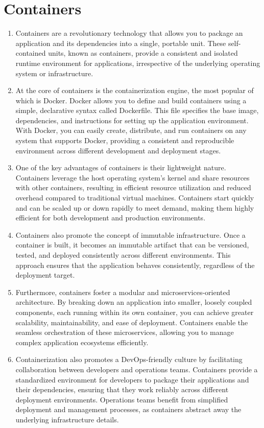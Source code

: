 \section*{Containers}

\begin{enumerate}
    \item Containers are a revolutionary technology that allows you to package an application and its dependencies into a single, portable unit. These self-contained units, known as containers, provide a consistent and isolated runtime environment for applications, irrespective of the underlying operating system or infrastructure.

    \item At the core of containers is the containerization engine, the most popular of which is Docker. Docker allows you to define and build containers using a simple, declarative syntax called Dockerfile. This file specifies the base image, dependencies, and instructions for setting up the application environment. With Docker, you can easily create, distribute, and run containers on any system that supports Docker, providing a consistent and reproducible environment across different development and deployment stages.

    \item One of the key advantages of containers is their lightweight nature. Containers leverage the host operating system's kernel and share resources with other containers, resulting in efficient resource utilization and reduced overhead compared to traditional virtual machines. Containers start quickly and can be scaled up or down rapidly to meet demand, making them highly efficient for both development and production environments.

    \item Containers also promote the concept of immutable infrastructure. Once a container is built, it becomes an immutable artifact that can be versioned, tested, and deployed consistently across different environments. This approach ensures that the application behaves consistently, regardless of the deployment target.

    \item Furthermore, containers foster a modular and microservices-oriented architecture. By breaking down an application into smaller, loosely coupled components, each running within its own container, you can achieve greater scalability, maintainability, and ease of deployment. Containers enable the seamless orchestration of these microservices, allowing you to manage complex application ecosystems efficiently.

    \item Containerization also promotes a DevOps-friendly culture by facilitating collaboration between developers and operations teams. Containers provide a standardized environment for developers to package their applications and their dependencies, ensuring that they work reliably across different deployment environments. Operations teams benefit from simplified deployment and management processes, as containers abstract away the underlying infrastructure details.

\end{enumerate}

